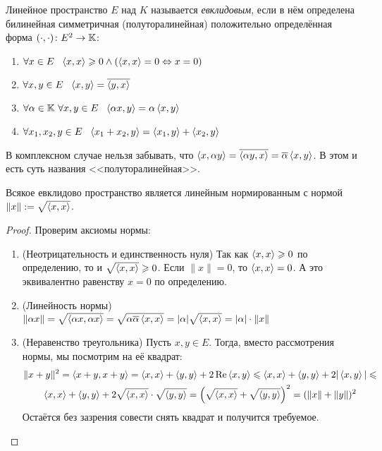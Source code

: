 \begin{definition}
	Линейное пространство $E$ над $K$ называется \textit{евклидовым}, если в нём определена билинейная симметричная (полуторалинейная) положительно определённая форма $(\cdot, \cdot) \colon E^2 \to \mathbb{K}$:
	\begin{enumerate}
		\item $\forall x \in E\ \ \left\langle x, x\right\rangle \geqslant 0 \wedge (\left\langle x, x\right\rangle = 0 \Leftrightarrow x = 0)$
		
		\item $\forall x, y \in E\ \ \left\langle x, y\right\rangle = \overline{\left\langle y, x\right\rangle}$
		
		\item $\forall \alpha \in \mathbb{K}\ \forall x, y \in E\ \ \left\langle\alpha x, y\right\rangle = \alpha\left\langle x, y\right\rangle$
		
		\item $\forall x_1, x_2, y \in E\ \ \left\langle x_1 + x_2, y\right\rangle = \left\langle x_1, y\right\rangle + \left\langle x_2, y\right\rangle$
	\end{enumerate}
\end{definition}

\begin{anote}
	В комплексном случае нельзя забывать, что $\left\langle x, \alpha y\right\rangle = \overline{\left\langle\alpha y, x\right\rangle} = \overline{\alpha}\left\langle x, y\right\rangle$. В этом и есть суть названия <<полуторалинейная>>.
\end{anote}

\begin{proposition}
	Всякое евклидово пространство является линейным нормированным с нормой $\|x\| := \sqrt{\left\langle x, x\right\rangle}$.
\end{proposition}

\begin{proof}
	Проверим аксиомы нормы:
	\begin{enumerate}
		\item (Неотрицательность и единственность нуля) Так как $\left\langle x, x\right\rangle \geqslant 0$ по определению, то и $\sqrt{\left\langle x, x\right\rangle} \geqslant 0$. Если $\|x\| = 0$, то $\left\langle x, x\right\rangle = 0$. А это эквивалентно равенству $x = 0$ по определению.
		
		\item (Линейность нормы) $\|\alpha x\| = \sqrt{\left\langle\alpha x, \alpha x\right\rangle} = \sqrt{\alpha\overline{\alpha}\left\langle x, x\right\rangle} = |\alpha|\sqrt{\left\langle x, x\right\rangle} = |\alpha| \cdot \|x\|$
		
		\item (Неравенство треугольника) Пусть $x, y \in E$. Тогда, вместо рассмотрения нормы, мы посмотрим на её квадрат:
		\begin{multline*}
			\|x + y\|^2 = \left\langle x + y, x + y\right\rangle = \left\langle x, x\right\rangle + \left\langle y, y\right\rangle + 2\operatorname{Re} \left\langle x, y\right\rangle \leqslant \left\langle x, x\right\rangle + \left\langle y, y\right\rangle + 2|\left\langle x, y\right\rangle| \leqslant
			\\
			\left\langle x, x\right\rangle + \left\langle y, y\right\rangle + 2\sqrt{\left\langle x, x\right\rangle} \cdot \sqrt{\left\langle y, y\right\rangle} = \left(\sqrt{\left\langle x, x\right\rangle} + \sqrt{\left\langle y, y\right\rangle}\right)^2 = (\|x\| + \|y\|)^2
		\end{multline*}
		Остаётся без зазрения совести снять квадрат и получится требуемое.
	\end{enumerate}
\end{proof}


